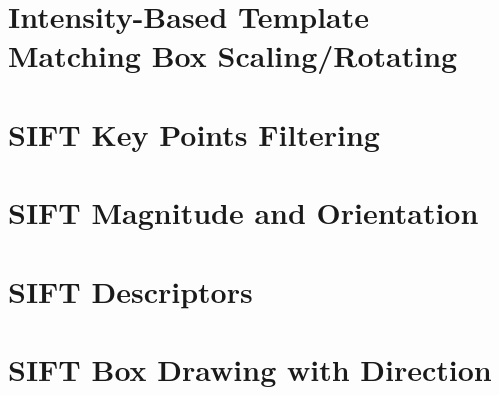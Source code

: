 \documentclass[a4paper,11pt,twocolumn]{article}
\begin{document}
\begin{appendices}
\section{Intensity-Based Template Matching Box Scaling/Rotating}


\clearpage
\section{SIFT Key Points Filtering}


\section{SIFT Magnitude and Orientation}


\section{SIFT Descriptors}


\section{SIFT Box Drawing with Direction}


\end{appendices}
\end{document}
